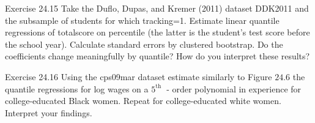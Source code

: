 \documentclass[10pt]{article}
\begin{document}
Exercise 24.15 Take the Duflo, Dupas, and Kremer (2011) dataset DDK2011 and the subsample of students for which tracking=1. Estimate linear quantile regressions of totalscore on percentile (the latter is the student's test score before the school year). Calculate standard errors by clustered bootstrap. Do the coefficients change meaningfully by quantile? How do you interpret these results?

Exercise 24.16 Using the cps09mar dataset estimate similarly to Figure $24.6$ the quantile regressions for log wages on a $5^{\text {th }}$ - order polynomial in experience for college-educated Black women. Repeat for college-educated white women. Interpret your findings.
\end{document}
